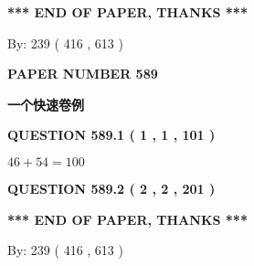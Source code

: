\documentclass{ctexart}
\begin{document}
   
 \vspace{0.2in}
 
   
   
   
   
\vspace{1.0in} 
{\textbf{\large{ *** END OF PAPER, THANKS *** }}} 
   
   
\hspace{1.0in} By: 
 239 ( 416 ,  613 )
   
   
   
   
\newpage 
\setcounter{page}{ 
   589001 } 
   
   
   
   
 {\textbf{ \Large{ PAPER NUMBER  589  }}}
   
   
\vspace{0.2in}
   
   
   
   
   
   
 \vspace{0.2in}
{\LARGE {\textbf{ 一个快速卷例}}}
   
   
  
\vspace{0.2in}
  
{\textbf{\Large{QUESTION
589.1 
 ( 1 , 1 , 101 )
}}}
  
  
 
 

$ %
46 +  %
54=   %
100$
 
 
  
\vspace{0.2in}
  
{\textbf{\Large{QUESTION
589.2 
 ( 2 , 2 , 201 )
}}}
  
  
   
   
 \vspace{0.2in}
 
   
   
   
   
\vspace{1.0in} 
{\textbf{\large{ *** END OF PAPER, THANKS *** }}} 
   
   
\hspace{1.0in} By: 
 239 ( 416 ,  613 )
   
   
   
   
\newpage 
\setcounter{page}{ 
   590001 } 
   
   
   
\end{document}
